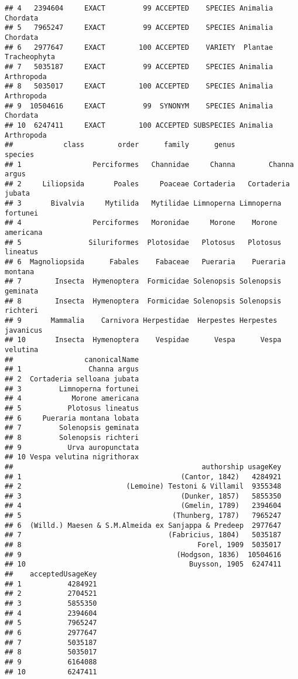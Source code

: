 \documentclass[
]{article}
\begin{document}
\begin{verbatim}
## 4   2394604     EXACT         99 ACCEPTED    SPECIES Animalia     Chordata
## 5   7965247     EXACT         99 ACCEPTED    SPECIES Animalia     Chordata
## 6   2977647     EXACT        100 ACCEPTED    VARIETY  Plantae Tracheophyta
## 7   5035187     EXACT         99 ACCEPTED    SPECIES Animalia   Arthropoda
## 8   5035017     EXACT        100 ACCEPTED    SPECIES Animalia   Arthropoda
## 9  10504616     EXACT         99  SYNONYM    SPECIES Animalia     Chordata
## 10  6247411     EXACT        100 ACCEPTED SUBSPECIES Animalia   Arthropoda
##            class        order      family      genus             species
## 1                 Perciformes   Channidae     Channa        Channa argus
## 2     Liliopsida       Poales     Poaceae Cortaderia   Cortaderia jubata
## 3       Bivalvia     Mytilida   Mytilidae Limnoperna Limnoperna fortunei
## 4                 Perciformes   Moronidae     Morone    Morone americana
## 5                Siluriformes  Plotosidae   Plotosus   Plotosus lineatus
## 6  Magnoliopsida      Fabales    Fabaceae   Pueraria    Pueraria montana
## 7        Insecta  Hymenoptera  Formicidae Solenopsis Solenopsis geminata
## 8        Insecta  Hymenoptera  Formicidae Solenopsis Solenopsis richteri
## 9       Mammalia    Carnivora Herpestidae  Herpestes Herpestes javanicus
## 10       Insecta  Hymenoptera    Vespidae      Vespa      Vespa velutina
##                 canonicalName
## 1                Channa argus
## 2  Cortaderia selloana jubata
## 3         Limnoperna fortunei
## 4            Morone americana
## 5           Plotosus lineatus
## 6     Pueraria montana lobata
## 7         Solenopsis geminata
## 8         Solenopsis richteri
## 9           Urva auropunctata
## 10 Vespa velutina nigrithorax
##                                             authorship usageKey
## 1                                      (Cantor, 1842)   4284921
## 2                         (Lemoine) Testoni & Villamil  9355348
## 3                                      (Dunker, 1857)   5855350
## 4                                      (Gmelin, 1789)   2394604
## 5                                    (Thunberg, 1787)   7965247
## 6  (Willd.) Maesen & S.M.Almeida ex Sanjappa & Predeep  2977647
## 7                                   (Fabricius, 1804)   5035187
## 8                                          Forel, 1909  5035017
## 9                                     (Hodgson, 1836)  10504616
## 10                                       Buysson, 1905  6247411
##    acceptedUsageKey
## 1           4284921
## 2           2704521
## 3           5855350
## 4           2394604
## 5           7965247
## 6           2977647
## 7           5035187
## 8           5035017
## 9           6164088
## 10          6247411
\end{verbatim}
\end{document}
